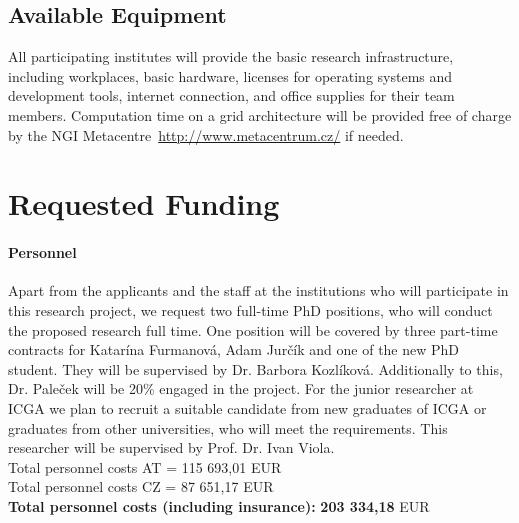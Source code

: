 \documentclass[11pt,a4paper,titlepage,oneside,onecolumn]{article}
\begin{document}
\subsection{Available Equipment}
\label{subsec:AvailableEquipment}
All participating institutes will provide the basic research infrastructure, including workplaces, basic hardware, licenses for operating systems and development tools, internet connection, and office supplies for their team members. 
Computation time on a grid architecture will be provided free of charge by the NGI Metacentre~\url{http://www.metacentrum.cz/} if needed. 


\section{Requested Funding}
\label{sec:RequestedFunding}

\paragraph{Personnel}
Apart from the applicants and the staff at the institutions who will participate in this research project, we request two full-time PhD positions, who will conduct the proposed research full time. 
One position will be covered by three part-time contracts for Katar\'{i}na Furmanov\'{a}, Adam Jur\v{c}\'{i}k and one of the new PhD student. 
They will be supervised by Dr. Barbora Kozl\'{i}kov\'{a}.
Additionally to this, Dr. Pale\v{c}ek will be 20\% engaged in the project.
For the junior researcher at ICGA we plan to recruit a suitable candidate from new graduates of ICGA or graduates from other universities, who will meet the requirements.
This researcher will be supervised by Prof. Dr. Ivan Viola.\\
Total personnel costs AT = 115 693,01 EUR\\
Total personnel costs CZ = 87 651,17 EUR\\
\textbf{Total personnel costs (including insurance):}   \textbf{203 334,18} EUR
\end{document}
